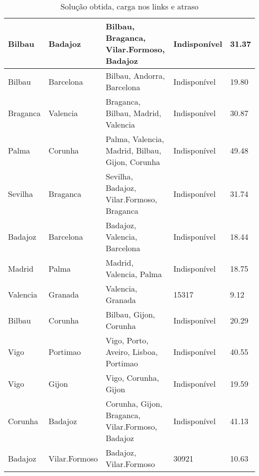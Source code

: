 \begin{table}[!htb]
{\begin{tabular}{|l|l|l|l|l|}
Bilbau & Badajoz & Bilbau, Braganca, Vilar.Formoso, Badajoz & Indisponível & 31.37 \\ \hline
Bilbau & Barcelona & Bilbau, Andorra, Barcelona & Indisponível & 19.80 \\ \hline
Braganca & Valencia & Braganca, Bilbau, Madrid, Valencia & Indisponível & 30.87 \\ \hline
Palma & Corunha & Palma, Valencia, Madrid, Bilbau, Gijon, Corunha & Indisponível & 49.48 \\ \hline
Sevilha & Braganca & Sevilha, Badajoz, Vilar.Formoso, Braganca & Indisponível & 31.74 \\ \hline
Badajoz & Barcelona & Badajoz, Valencia, Barcelona & Indisponível & 18.44 \\ \hline
Madrid & Palma & Madrid, Valencia, Palma & Indisponível & 18.75 \\ \hline
Valencia & Granada & Valencia, Granada & 15317 & 9.12 \\ \hline
Bilbau & Corunha & Bilbau, Gijon, Corunha & Indisponível & 20.29 \\ \hline
Vigo & Portimao & Vigo, Porto, Aveiro, Lisboa, Portimao & Indisponível & 40.55 \\ \hline
Vigo & Gijon & Vigo, Corunha, Gijon & Indisponível & 19.59 \\ \hline
Corunha & Badajoz & Corunha, Gijon, Braganca, Vilar.Formoso, Badajoz & Indisponível & 41.13 \\ \hline
Badajoz & Vilar.Formoso & Badajoz, Vilar.Formoso & 30921 & 10.63 \\ \hline
\end{tabular}}
\caption[]{Solução obtida, carga nos links e atraso}
\end{table}

